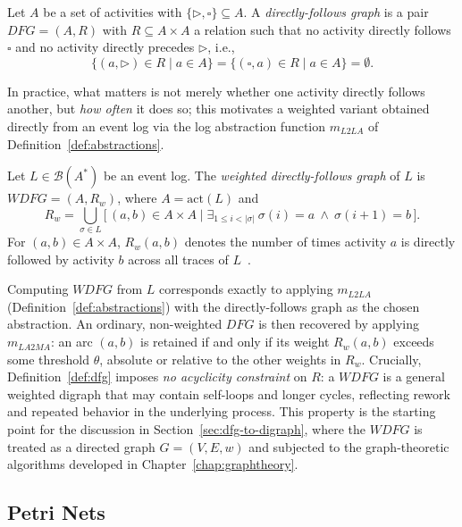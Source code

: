 \begin{definition}
	\label{def:dfg}
	Let $A$ be a set of activities with $\{\triangleright, \square\} \subseteq A$.
	A \emph{directly-follows graph} is a pair $DFG = (A, R)$ with
	$R \subseteq A \times A$ a relation such that no activity directly follows
	$\square$ and no activity directly precedes $\triangleright$, i.e.,
	\[
	\{ (a, \triangleright) \in R \mid a \in A \} =
	\{ (\square, a) \in R \mid a \in A \} = \emptyset.
	\]
\end{definition}

In practice, what matters is not merely whether one activity directly
follows another, but \emph{how often} it does so; this motivates a weighted
variant obtained directly from an event log via the log abstraction function
$m_{L2LA}$ of Definition~\ref{def:abstractions}.

\begin{definition}
	\label{def:wdfg}
	Let $L \in \mathcal{B}(A^{*})$ be an event log. The \emph{weighted
		directly-follows graph} of $L$ is $WDFG = (A, R_w)$, where $A = \mathrm{act}(L)$
	and
	\[
	R_w = \bigcup_{\sigma \in L} \bigl[\, (a, b) \in A \times A \mid
	\exists_{1 \leq i < |\sigma|}\ \sigma(i) = a \ \wedge\ \sigma(i+1) = b \,\bigr].
	\]
	For $(a, b) \in A \times A$, $R_w(a, b)$ denotes the number of times activity
	$a$ is directly followed by activity $b$ across all traces of
	$L$~\cite{aalst2018reconstruction}.
\end{definition}

Computing $WDFG$ from $L$ corresponds exactly to applying $m_{L2LA}$
(Definition~\ref{def:abstractions}) with the directly-follows graph as the
chosen abstraction. An ordinary, non-weighted $DFG$ is then recovered by
applying $m_{LA2MA}$: an arc $(a, b)$ is retained if and only if its weight
$R_w(a, b)$ exceeds some threshold $\theta$, absolute or relative to the
other weights in $R_w$. Crucially, Definition~\ref{def:dfg} imposes
\emph{no acyclicity constraint} on $R$: a $WDFG$ is a general weighted
digraph that may contain self-loops and longer cycles, reflecting rework and
repeated behavior in the underlying process. This property is the starting
point for the discussion in Section~\ref{sec:dfg-to-digraph}, where the
$WDFG$ is treated as a directed graph $G = (V, E, w)$ and subjected to the
graph-theoretic algorithms developed in Chapter~\ref{chap:graphtheory}.

\subsection{Petri Nets}
\label{subsec:petri-nets}

